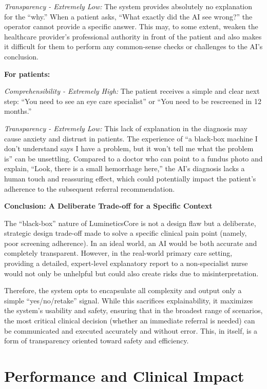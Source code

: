 \documentclass[sigplan,screen]{acmart}
\begin{document}
\textit{Transparency - Extremely Low:} The system provides absolutely no explanation for the ``why.'' When a patient asks, ``What exactly did the AI see wrong?'' the operator cannot provide a specific answer. This may, to some extent, weaken the healthcare provider's professional authority in front of the patient and also makes it difficult for them to perform any common-sense checks or challenges to the AI's conclusion.

\textbf{For patients:}

\textit{Comprehensibility - Extremely High:} The patient receives a simple and clear next step: ``You need to see an eye care specialist'' or ``You need to be rescreened in 12 months.''

\textit{Transparency - Extremely Low:} This lack of explanation in the diagnosis may cause anxiety and distrust in patients. The experience of ``a black-box machine I don't understand says I have a problem, but it won't tell me what the problem is'' can be unsettling. Compared to a doctor who can point to a fundus photo and explain, ``Look, there is a small hemorrhage here,'' the AI's diagnosis lacks a human touch and reassuring effect, which could potentially impact the patient's adherence to the subsequent referral recommendation.

\textbf{Conclusion: A Deliberate Trade-off for a Specific Context}

The ``black-box'' nature of LumineticsCore is not a design flaw but a deliberate, strategic design trade-off made to solve a specific clinical pain point (namely, poor screening adherence). In an ideal world, an AI would be both accurate and completely transparent. However, in the real-world primary care setting, providing a detailed, expert-level explanatory report to a non-specialist nurse would not only be unhelpful but could also create risks due to misinterpretation.

Therefore, the system opts to encapsulate all complexity and output only a simple ``yes/no/retake'' signal. While this sacrifices explainability, it maximizes the system's usability and safety, ensuring that in the broadest range of scenarios, the most critical clinical decision (whether an immediate referral is needed) can be communicated and executed accurately and without error. This, in itself, is a form of transparency oriented toward safety and efficiency.

\section{Performance and Clinical Impact}
\end{document}
